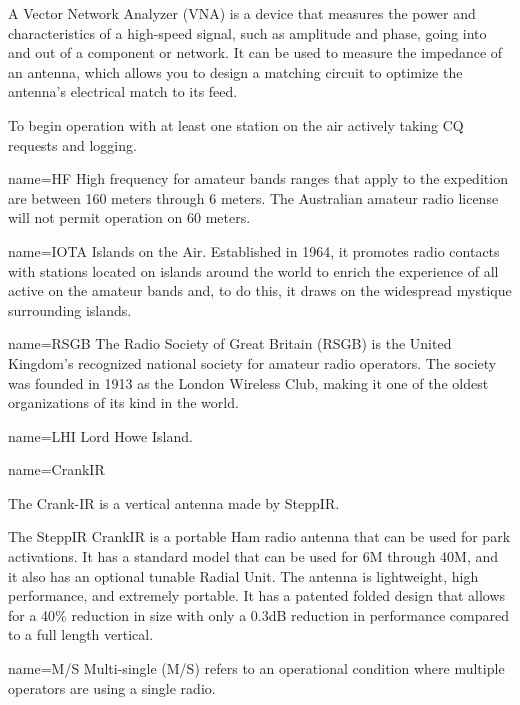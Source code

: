 
{
A Vector Network Analyzer (VNA) is a device that measures the power and characteristics of a high-speed signal, such as amplitude and phase, going into and out of a component or network. It can be used to measure the impedance of an antenna, which allows you to design a matching circuit to optimize the antenna's electrical match to its feed. 
}

{
To begin operation with at least one station on the air
actively taking CQ requests and logging.
}


 { name={{HF}} }
{
High frequency for amateur bands ranges that apply to the expedition
are between 160 meters through 6 meters.  The Australian amateur
radio license will not permit operation on 60 meters.}

 { name={{IOTA}} }
{Islands on the Air. 
Established in 1964, it promotes radio contacts with stations located on islands around the world to enrich the experience of all active on the amateur bands and, to do this, it draws on the widespread mystique surrounding islands.}


 { name={{RSGB}} }
{
The Radio Society of Great Britain (RSGB) is the United Kingdom's recognized national society for amateur radio operators. The society was founded in 1913 as the London Wireless Club, making it one of the oldest organizations of its kind in the world.
}


 { name={{LHI}} }
{
Lord Howe Island.
}


 { name={{CrankIR}} }
{
The Crank-IR is a vertical antenna made by SteppIR.
\par
The SteppIR CrankIR is a portable Ham radio antenna that can be used for park activations. It has a standard model that can be used for 6M through 40M, and it also has an optional tunable Radial Unit. The antenna is lightweight, high performance, and extremely portable. It has a patented folded design that allows for a 40\% reduction in size with only a 0.3dB reduction in performance compared to a full length vertical.
}

 { name={{M/S}} }
{
Multi-single (M/S) refers to an operational condition where multiple
operators are using a single radio.
}


